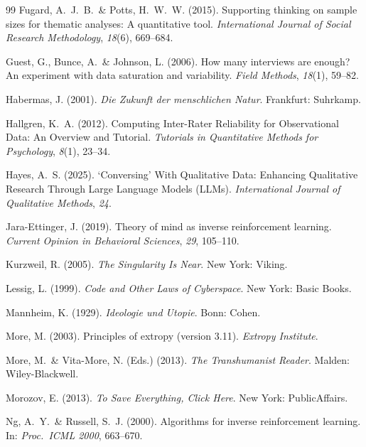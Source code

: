 \documentclass[12pt,a4paper]{article}
\begin{document}
\begin{thebibliography}{99}
  Fugard, A.~J.~B.~\& Potts, H.~W.~W. (2015).
  Supporting thinking on sample sizes for thematic analyses: A quantitative tool.
  \textit{International Journal of Social Research Methodology}, \textit{18}(6), 669--684.

  Guest, G., Bunce, A.~\& Johnson, L. (2006).
  How many interviews are enough? An experiment with data saturation and variability.
  \textit{Field Methods}, \textit{18}(1), 59--82.

  Habermas, J. (2001).
  \textit{Die Zukunft der menschlichen Natur}.
  Frankfurt: Suhrkamp.

  Hallgren, K.~A. (2012).
  Computing Inter-Rater Reliability for Observational Data: An Overview and Tutorial.
  \textit{Tutorials in Quantitative Methods for Psychology}, \textit{8}(1), 23--34.

  Hayes, A.~S. (2025).
  `Conversing' With Qualitative Data: Enhancing Qualitative Research Through Large Language Models (LLMs).
  \textit{International Journal of Qualitative Methods}, \textit{24}.

  Jara-Ettinger, J. (2019).
  Theory of mind as inverse reinforcement learning.
  \textit{Current Opinion in Behavioral Sciences}, \textit{29}, 105--110.

  Kurzweil, R. (2005).
  \textit{The Singularity Is Near}.
  New York: Viking.

  Lessig, L. (1999).
  \textit{Code and Other Laws of Cyberspace}.
  New York: Basic Books.

  Mannheim, K. (1929).
  \textit{Ideologie und Utopie}.
  Bonn: Cohen.

  More, M. (2003).
  Principles of extropy (version 3.11).
  \textit{Extropy Institute}.

  More, M.~\& Vita-More, N. (Eds.) (2013).
  \textit{The Transhumanist Reader}.
  Malden: Wiley-Blackwell.

  Morozov, E. (2013).
  \textit{To Save Everything, Click Here}.
  New York: PublicAffairs.

  Ng, A.~Y.~\& Russell, S.~J. (2000).
  Algorithms for inverse reinforcement learning.
  In: \textit{Proc.\ ICML 2000}, 663--670.


\end{thebibliography}
\end{document}
